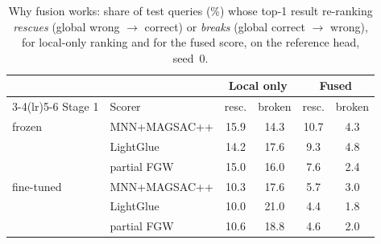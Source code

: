 \begin{table}[t]
\centering
\caption{Why fusion works: share of test queries (\%) whose top-1 result re-ranking \emph{rescues} (global wrong $\to$ correct) or \emph{breaks} (global correct $\to$ wrong), for local-only ranking and for the fused score, on the reference head, seed~0.}
\label{tab:rescue}
\footnotesize
\setlength{\tabcolsep}{3pt}
\begin{tabular}{@{}llcccc@{}}
\toprule
& & \multicolumn{2}{c}{Local only} & \multicolumn{2}{c}{Fused} \\
\cmidrule(lr){3-4}\cmidrule(lr){5-6}
Stage 1 & Scorer & resc. & broken & resc. & broken \\
\midrule
frozen & MNN+MAGSAC++ & 15.9 & 14.3 & 10.7 & 4.3 \\
 & LightGlue & 14.2 & 17.6 & 9.3 & 4.8 \\
 & partial FGW & 15.0 & 16.0 & 7.6 & 2.4 \\
\midrule
fine-tuned & MNN+MAGSAC++ & 10.3 & 17.6 & 5.7 & 3.0 \\
 & LightGlue & 10.0 & 21.0 & 4.4 & 1.8 \\
 & partial FGW & 10.6 & 18.8 & 4.6 & 2.0 \\
\bottomrule
\end{tabular}
\end{table}